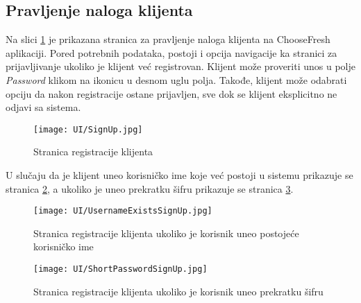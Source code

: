 \subsection{Pravljenje naloga klijenta}

Na slici \ref{fig:SignUp} je prikazana stranica za pravljenje naloga klijenta na ChooseFresh aplikaciji. Pored potrebnih podataka, postoji i opcija navigacije ka stranici za prijavljivanje ukoliko je klijent već registrovan. Klijent može proveriti unos u polje \textit{Password} klikom na ikonicu u desnom uglu polja. Takođe, klijent može odabrati opciju da nakon registracije ostane prijavljen, sve dok se klijent eksplicitno ne odjavi sa sistema.

\begin{figure}[H]
	\begin{center}
		\texttt{[image: UI/SignUp.jpg]}
    		\caption{Stranica registracije klijenta}
    \label{fig:SignUp}
    \end{center}
\end{figure}


U slučaju da je klijent uneo korisničko ime koje već postoji u sistemu prikazuje se stranica \ref{fig:UsernameExists}, a ukoliko je uneo prekratku šifru prikazuje se stranica \ref{fig:ShortPassword}.

\begin{figure}[H]
	\begin{center}
		\texttt{[image: UI/UsernameExistsSignUp.jpg]}
    		\caption{Stranica registracije klijenta ukoliko je korisnik uneo postojeće korisničko ime}
    \label{fig:UsernameExists}
    \end{center}
\end{figure}

\begin{figure}[H]
	\begin{center}
		\texttt{[image: UI/ShortPasswordSignUp.jpg]}
    		\caption{Stranica registracije klijenta ukoliko je korisnik uneo prekratku šifru}
    \label{fig:ShortPassword}
    \end{center}
\end{figure}
